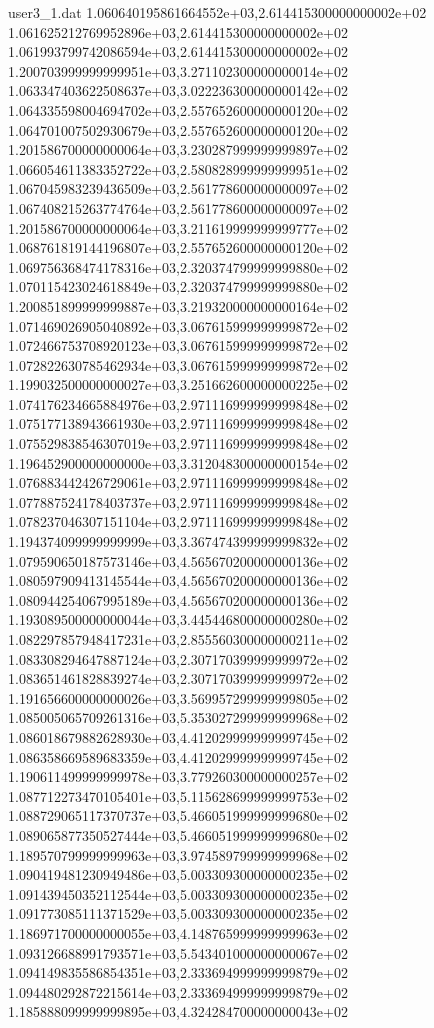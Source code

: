\begin{filecontents}{user3_1.dat}
1.060640195861664552e+03,2.614415300000000002e+02
1.061625212769952896e+03,2.614415300000000002e+02
1.061993799742086594e+03,2.614415300000000002e+02
1.200703999999999951e+03,3.271102300000000014e+02
1.063347403622508637e+03,3.022236300000000142e+02
1.064335598004694702e+03,2.557652600000000120e+02
1.064701007502930679e+03,2.557652600000000120e+02
1.201586700000000064e+03,3.230287999999999897e+02
1.066054611383352722e+03,2.580828999999999951e+02
1.067045983239436509e+03,2.561778600000000097e+02
1.067408215263774764e+03,2.561778600000000097e+02
1.201586700000000064e+03,3.211619999999999777e+02
1.068761819144196807e+03,2.557652600000000120e+02
1.069756368474178316e+03,2.320374799999999880e+02
1.070115423024618849e+03,2.320374799999999880e+02
1.200851899999999887e+03,3.219320000000000164e+02
1.071469026905040892e+03,3.067615999999999872e+02
1.072466753708920123e+03,3.067615999999999872e+02
1.072822630785462934e+03,3.067615999999999872e+02
1.199032500000000027e+03,3.251662600000000225e+02
1.074176234665884976e+03,2.971116999999999848e+02
1.075177138943661930e+03,2.971116999999999848e+02
1.075529838546307019e+03,2.971116999999999848e+02
1.196452900000000000e+03,3.312048300000000154e+02
1.076883442426729061e+03,2.971116999999999848e+02
1.077887524178403737e+03,2.971116999999999848e+02
1.078237046307151104e+03,2.971116999999999848e+02
1.194374099999999999e+03,3.367474399999999832e+02
1.079590650187573146e+03,4.565670200000000136e+02
1.080597909413145544e+03,4.565670200000000136e+02
1.080944254067995189e+03,4.565670200000000136e+02
1.193089500000000044e+03,3.445446800000000280e+02
1.082297857948417231e+03,2.855560300000000211e+02
1.083308294647887124e+03,2.307170399999999972e+02
1.083651461828839274e+03,2.307170399999999972e+02
1.191656600000000026e+03,3.569957299999999805e+02
1.085005065709261316e+03,5.353027299999999968e+02
1.086018679882628930e+03,4.412029999999999745e+02
1.086358669589683359e+03,4.412029999999999745e+02
1.190611499999999978e+03,3.779260300000000257e+02
1.087712273470105401e+03,5.115628699999999753e+02
1.088729065117370737e+03,5.466051999999999680e+02
1.089065877350527444e+03,5.466051999999999680e+02
1.189570799999999963e+03,3.974589799999999968e+02
1.090419481230949486e+03,5.003309300000000235e+02
1.091439450352112544e+03,5.003309300000000235e+02
1.091773085111371529e+03,5.003309300000000235e+02
1.186971700000000055e+03,4.148765999999999963e+02
1.093126688991793571e+03,5.543401000000000067e+02
1.094149835586854351e+03,2.333694999999999879e+02
1.094480292872215614e+03,2.333694999999999879e+02
1.185888099999999895e+03,4.324284700000000043e+02

\end{filecontents}
